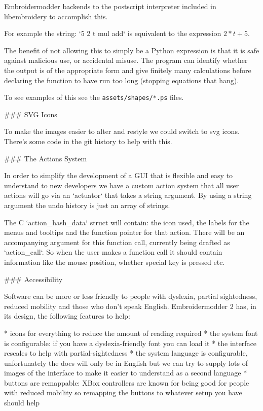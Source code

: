Embroidermodder backends to the postscript interpreter included in libembroidery
to accomplish this.

For example the string: `5 2 t mul add` is equivalent to
the expression $2*t + 5$.

The benefit of not allowing this to simply be a Python expression is that it is safe against
malicious use, or accidental misuse. The program can identify whether the output is of the
appropriate form and give finitely many calculations before declaring the function to have run
too long (stopping equations that hang).

To see examples of this see the \texttt{assets/shapes/*.ps} files.

### SVG Icons

To make the images easier to alter and restyle we could switch to svg icons.
There's some code in the git history to help with this.

### The Actions System

In order to simplify the development of a GUI that is flexible and easy to
understand to new developers we have a custom action system that all user
actions will go via an `actuator` that takes a string argument. By using a
string argument the undo history is just an array of strings.

The C `action\_hash\_data` struct will contain: the icon used, the
labels for the menus and tooltips and the function pointer for that action.
There will be an accompanying argument for this function call, currently being
drafted as `action\_call`. So when the user makes a function call it should
contain information like the mouse position, whether special key is pressed etc.

### Accessibility

Software can be more or less friendly to people with dyslexia, partial
sightedness, reduced mobility and those who don't speak English. Embroidermodder
2 has, in its design, the following features to help:

* icons for everything to reduce the amount of reading required
* the system font is configurable: if you have a dyslexia-friendly font you can load it
* the interface rescales to help with partial-sightedness
* the system language is configurable, unfortunately the docs will only be in English but we can try to supply lots of images of the interface to make it easier to understand as a second language
* buttons are remappable: XBox controllers are known for being good for people with reduced mobility so remapping the buttons to whatever setup you have should help

